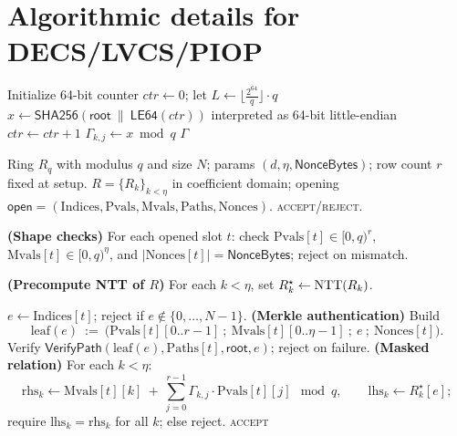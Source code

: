 \appendix
\section{Algorithmic details for DECS/LVCS/PIOP}
\label{app:alg-details}

\begin{algorithm}[H]
\caption{\textsf{DECS.DeriveGamma}$(\mathsf{root},\eta,r,q)\rightarrow \Gamma$ \quad \emph{(Verifier and Prover)}}\label{alg:decs-derivegamma}
\begin{algorithmic}[1]
\State Initialize 64-bit counter $ctr\gets 0$;\; let $L\gets \big\lfloor \frac{2^{64}}{q}\big\rfloor\cdot q$ 
 
   
    \Repeat
      \State $x \gets \textsf{SHA256}(\mathsf{root}\ \|\ \textsf{LE64}(ctr))$ interpreted as 64-bit little-endian
      \State $ctr\gets ctr+1$
     
    \State $\Gamma_{k,j}\gets x \bmod q$
  \EndFor
\EndFor
\State \Return $\Gamma$
\end{algorithmic}
\end{algorithm}

\begin{algorithm}[H]
\caption{\textsf{DECS.VerifyEval}$(\mathsf{root},\Gamma,R,\mathsf{open})$ \quad \emph{(Verifier)}}\label{alg:decs-verifyeval}
\begin{algorithmic}[1]
\Require Ring $R_q$ with modulus $q$ and size $N$; params $(d,\eta,\textsf{NonceBytes})$; row count $r$ fixed at setup.
\Require $R=\{R_k\}_{k<\eta}$ in coefficient domain; opening $\mathsf{open}=(\mathrm{Indices},\mathrm{Pvals},\mathrm{Mvals},\mathrm{Paths},\mathrm{Nonces})$.
\Ensure \textsc{accept}/\textsc{reject}.

\State \textbf{(Shape checks)} For each opened slot $t$:
       check $\mathrm{Pvals}[t]\in[0,q)^r$, $\mathrm{Mvals}[t]\in[0,q)^\eta$,
       and $|\mathrm{Nonces}[t]|=\textsf{NonceBytes}$; reject on mismatch.

\State \textbf{(Precompute NTT of $R$)} For each $k<\eta$, set $R^\star_k\gets \mathrm{NTT}(R_k)$.

  \State $e\gets \mathrm{Indices}[t]$; reject if $e\notin\{0,\dots,N-1\}$.
  \State \textbf{(Merkle authentication)} Build
  \[
      \mathrm{leaf}(e)\ :=\ \big(\mathrm{Pvals}[t][0..r\!-\!1]\ ;\ \mathrm{Mvals}[t][0..\eta\!-\!1]\ ;\ e\ ;\ \mathrm{Nonces}[t]\big).
  \]
  \State Verify $\textsf{VerifyPath}(\mathrm{leaf}(e),\mathrm{Paths}[t],\mathsf{root},e)$; reject on failure.
  \State \textbf{(Masked relation)} For each $k<\eta$:
    \[
      \mathrm{rhs}_k \gets \mathrm{Mvals}[t][k]\ +\ \sum_{j=0}^{r-1}\Gamma_{k,j}\cdot \mathrm{Pvals}[t][j]\ \bmod q,\qquad
      \mathrm{lhs}_k \gets R^\star_k[e];
    \]
    require $\mathrm{lhs}_k=\mathrm{rhs}_k$ for all $k$; else reject.
\EndFor
\State \Return \textsc{accept}
\end{algorithmic}
\end{algorithm}

